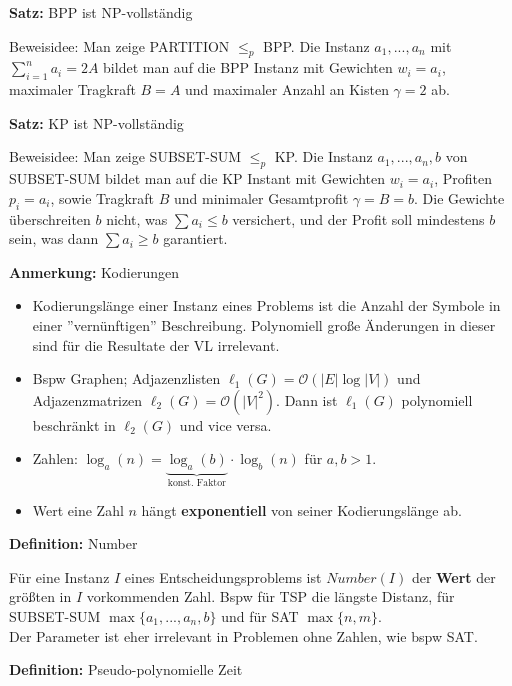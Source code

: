 \documentclass[a4paper,graphics,11pt]{article}
\begin{document}
\strut

\textbf{Satz:} BPP ist \textsf{NP}-vollständig

Beweisidee: Man zeige PARTITION $\leq_p$ BPP. Die Instanz $a_1,...,a_n$ mit $\sum_{i=1}^{n} a_i = 2A$
bildet man auf die BPP Instanz mit Gewichten $w_i = a_i$, maximaler Tragkraft $B = A$ und maximaler
Anzahl an Kisten $\gamma = 2$ ab.

\strut

\textbf{Satz:} KP ist \textsf{NP}-vollständig

Beweisidee: Man zeige SUBSET-SUM $\leq_p$ KP. Die Instanz $a_1,...,a_n,b$ von SUBSET-SUM
bildet man auf die KP Instant mit Gewichten $w_i = a_i$, Profiten $p_i = a_i$, sowie Tragkraft
$B$ und minimaler Gesamtprofit $\gamma = B = b$. Die Gewichte überschreiten $b$ nicht,
was $\sum a_i \leq b$ versichert, und der Profit soll mindestens $b$ sein, was dann
$\sum a_i \geq b$ garantiert.

\strut

\textbf{Anmerkung:} Kodierungen
\begin{itemize}
    \item Kodierungslänge einer Instanz eines Problems ist die Anzahl der Symbole in
        einer ''vernünftigen'' Beschreibung. Polynomiell große Änderungen
        in dieser sind für die Resultate der VL irrelevant.
    \item Bspw Graphen; Adjazenzlisten $\ell_1(G) = \mathcal{O}(|E| \log |V|)$ und
        Adjazenzmatrizen $\ell_2(G) = \mathcal{O}(|V|^2)$. Dann ist $\ell_1(G)$ polynomiell
        beschränkt in $\ell_2(G)$ und vice versa.
    \item Zahlen: $\log_a(n) = \underbrace{\log_a(b)}_{\text{konst. Faktor}} \cdot \log_b(n)$ für $a,b > 1$.
    \item Wert eine Zahl $n$ hängt \textbf{exponentiell} von seiner Kodierungslänge ab.
\end{itemize}

\newpage

\textbf{Definition:} Number

Für eine Instanz $I$ eines Entscheidungsproblems ist $Number(I)$ der \textbf{Wert} der größten
in $I$ vorkommenden Zahl. Bspw für TSP die längste Distanz, für SUBSET-SUM $\max\{a_1,...,a_n,b\}$
und für SAT $\max\{n,m\}$.\\
Der Parameter ist eher irrelevant in Problemen ohne Zahlen, wie bspw SAT.

\strut

\textbf{Definition:} Pseudo-polynomielle Zeit
\end{document}
